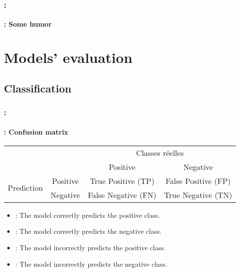 \documentclass[xcolor=table]{beamer}
\begin{document}
\begin{frame}
	\frametitle{\insertshortsubtitle: \insertsection}
	\framesubtitle{\insertsubsection: Some humor}
	
		\begin{center}
		\end{center}
	
\end{frame}

\section{Models' evaluation}

\begin{frame}
	\frametitle{\insertshortsubtitle}
	\framesubtitle{\insertsection}
	
	
\end{frame}

\subsection{Classification}

\begin{frame}
	\frametitle{\insertshortsubtitle: \insertsection}
	\framesubtitle{\insertsubsection: Confusion matrix}
	
	\begin{tabular}{|c|c|c|c|}
		\cline{3-4}
		\multicolumn{2}{c|}{}& \multicolumn{2}{c|}{Classes réelles} \\
		\cline{3-4}
		\multicolumn{2}{c|}{}& Positive & Negative \\
		\hline
		\multirow{2}{*}{Prediction} & Positive & True Positive (TP) & False Positive (FP) \\
		\cline{2-4}
		& Negative & False Negative (FN) & True Negative (TN) \\
		\hline
	\end{tabular}

	\begin{itemize}
		\item {}: The model correctly predicts the positive class.
		\item {}: The model correctly predicts the negative class.
		\item {}: The model incorrectly predicts the positive class.
		\item {}: The model incorrectly predicts the negative class.
	\end{itemize}
	
\end{frame}
\end{document}
